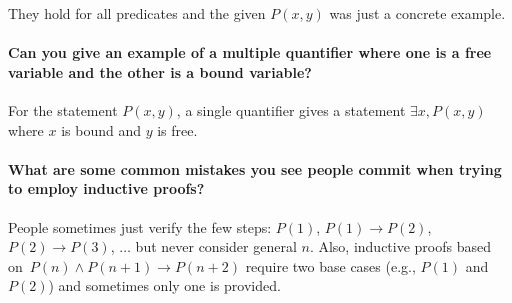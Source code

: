 \documentclass[10pt,english]{article}
\begin{document}
They hold for all predicates and the given $P(x,y)$ was just a concrete example.
    
\paragraph{Can you give an example of a multiple quantifier where one is a free variable and the other is a bound variable?}

For the statement $P(x,y)$, a single quantifier gives a statement $\exists x, P(x,y)$ where $x$ is bound and $y$ is free.

\paragraph{What are some common mistakes you see people commit when trying to employ inductive proofs?}

People sometimes just verify the few steps: $P(1)$, $P(1) \to P(2)$, $P(2) \to P(3)$, $\ldots$ but never consider general $n$.  Also, inductive proofs based on $P(n) \wedge P(n+1) \to P(n+2)$ require two base cases (e.g.,  $P(1)$ and $P(2)$) and sometimes only one is provided.
    
    
\end{document}
